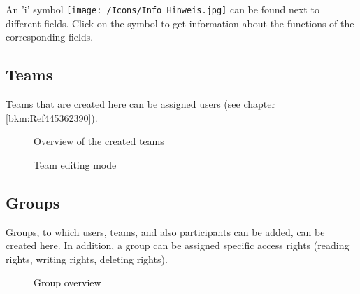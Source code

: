 An 'i' symbol \texttt{[image: /Icons/Info\_Hinweis.jpg]} can be found next to different fields. Click on the symbol to get information about the functions of the corresponding fields.

\subsection{Teams}

Teams that are created here can be assigned users (see chapter \ref{bkm:Ref445362390}).

\begin{figure}[H]
\caption{Overview of the created teams}
\end{figure}

\begin{figure}[H]
\caption{Team editing mode}
\end{figure}

\clearpage
\subsection{Groups}

Groups, to which users, teams, and also participants can be added, can be created here. In addition, a group can be assigned specific access rights (reading rights, writing rights, deleting rights).

\begin{figure}[H]
\caption{Group overview}
\end{figure}

